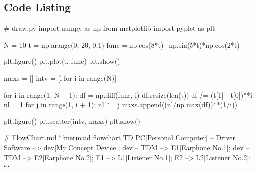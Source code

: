\documentclass{article}
\begin{document}
\begin{appendices}
\section{Code Listing}
\begin{python}
# draw.py
import numpy as np
from matplotlib import pyplot as plt

N = 10
t = np.arange(0, 20, 0.1)
func = np.cos(8*t)+np.sin(5*t)*np.cos(2*t)

plt.figure()
plt.plot(t, func)
plt.show()

maxs = []
intv = [i for i in range(N)]

for i in range(1, N + 1):
    df = np.diff(func, i)
    df.resize(len(t))
    df /= (t[1] - t[0])**i
    nl = 1
    for j in range(1, i + 1):
        nl *= j
    maxs.append((nl/np.max(df))**(1/i))

plt.figure()
plt.scatter(intv, maxs)
plt.show()
\end{python}

\begin{python}
# FlowChart.md
```mermaid
flowchart TD
	PC[Personal Computer] -- Driver Software --> dev[My Concept Device];
	dev -- TDM --> E1[Earphone No.1];
	dev -- TDM --> E2[Earphone No.2];
	E1 --> L1[Listener No.1];
	E2 --> L2[Listener No.2];
```
\end{python}
\end{appendices}
\end{document}
